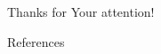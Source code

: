 \begin{frame}[focus]
    Thanks for Your attention!
\end{frame}

\appendix
\begin{frame}[allowframebreaks]{References}
    \nocite{*}
    
    
\end{frame}

